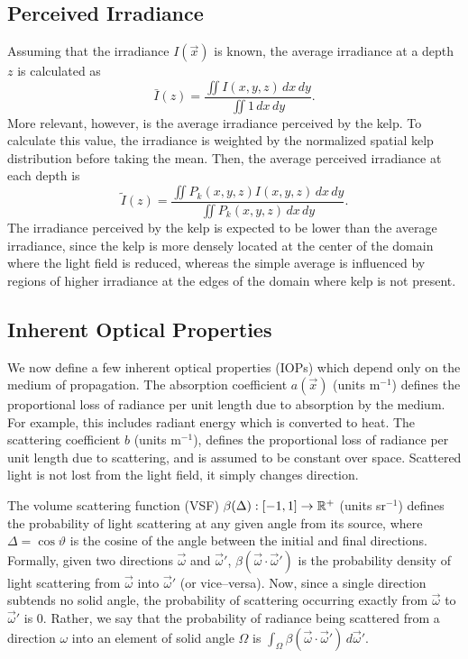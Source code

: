 \subsection{Perceived Irradiance}
\label{sec:perceived_irrad}
Assuming that the irradiance $I(\vec{x})$ is known,
the average irradiance at a depth $z$ is calculated as
\begin{equation*}
  \bar{I}(z) = \frac{\iint I(x,y,z)\, dx\, dy}{\iint 1\, dx\, dy}.
\end{equation*}
More relevant, however, is the average irradiance perceived by the kelp.
To calculate this value, the irradiance is weighted by the
normalized spatial kelp distribution before taking the mean.
Then, the average perceived irradiance at each depth is
\newcommand{\Iperk}{\tilde{I}}
\begin{equation*}
   \Iperk(z) = \frac{\iint P_k(x,y,z)I(x,y,z)\, dx\, dy}{\iint P_k(x,y,z)\, dx\, dy}.
\end{equation*}
The irradiance perceived by the kelp is expected to be lower than the average irradiance,
since the kelp is more densely located at the center of the domain where the light field is reduced,
whereas the simple average is influenced by regions of higher irradiance at the edges of the domain where kelp is not present.

\subsection{Inherent Optical Properties}
\label{sec:iops}
We now define a few inherent optical properties (IOPs) which depend only on the medium of propagation.
The absorption coefficient $a(\vec{x})$ (units m$^{-1}$) defines the
proportional loss of radiance per unit length due to absorption by the medium.
For example, this includes radiant energy which is converted to heat.
The scattering coefficient $b$ (units m$^{-1}$), defines the proportional loss
of radiance per unit length due to scattering, and is assumed to be constant over space.
Scattered light is not lost from the light field, it simply changes direction.

The volume scattering function (VSF) $\beta(\Delta): [-1, 1] \to \mathbb{R}^+$ (units sr$^{-1}$) defines the probability of light scattering at any given angle from its source, where $\Delta=\cos\vartheta$ is the cosine of the angle between the initial and final directions.
Formally, given two directions $\vec{\omega}$ and $\vec{\omega}'$, $\beta(\vec{\omega} \cdot \vec{\omega}')$ is the probability density of light scattering from $\vec{\omega}$ into $\vec{\omega}'$ (or vice--versa).
Now, since a single direction subtends no solid angle, the probability of scattering occurring exactly from $\vec{\omega}$ to $\vec{\omega}'$ is 0.
Rather, we say that the probability of radiance being scattered from a direction $\omega$ into an element of solid angle $\Omega$ is $\int_\Omega \beta(\vec{\omega} \cdot \vec{\omega}')\, d\vec{\omega}'$.

